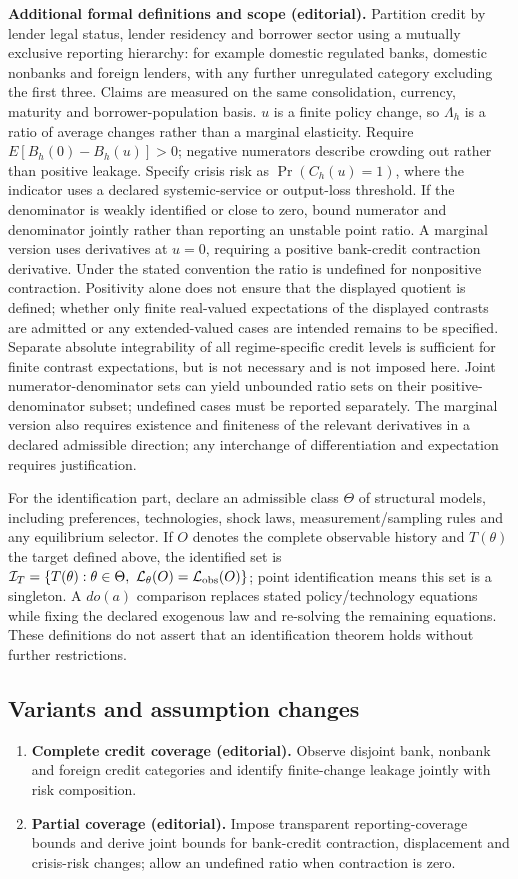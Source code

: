 \documentclass[11pt,a4paper]{article}
\begin{document}
\textbf{Additional formal definitions and scope (editorial).} Partition credit by lender legal status, lender residency and borrower sector using a mutually exclusive reporting hierarchy: for example domestic regulated banks, domestic nonbanks and foreign lenders, with any further unregulated category excluding the first three. Claims are measured on the same consolidation, currency, maturity and borrower-population basis. \(u\) is a finite policy change, so \(\Lambda_h\) is a ratio of average changes rather than a marginal elasticity. Require \(E[B_h(0)-B_h(u)]>0\); negative numerators describe crowding out rather than positive leakage. Specify crisis risk as \(\Pr(C_h(u)=1)\), where the indicator uses a declared systemic-service or output-loss threshold. If the denominator is weakly identified or close to zero, bound numerator and denominator jointly rather than reporting an unstable point ratio. A marginal version uses derivatives at \(u=0\), requiring a positive bank-credit contraction derivative. Under the stated convention the ratio is undefined for nonpositive contraction. Positivity alone does not ensure that the displayed quotient is defined; whether only finite real-valued expectations of the displayed contrasts are admitted or any extended-valued cases are intended remains to be specified. Separate absolute integrability of all regime-specific credit levels is sufficient for finite contrast expectations, but is not necessary and is not imposed here. Joint numerator-denominator sets can yield unbounded ratio sets on their positive-denominator subset; undefined cases must be reported separately. The marginal version also requires existence and finiteness of the relevant derivatives in a declared admissible direction; any interchange of differentiation and expectation requires justification.

For the identification part, declare an admissible class \(\Theta\) of structural models, including preferences, technologies, shock laws, measurement/sampling rules and any equilibrium selector. If \(O\) denotes the complete observable history and \(T(\theta)\) the target defined above, the identified set is \(\mathcal I_T=\{T(\theta):\theta\in\Theta,\ \mathcal L_\theta(O)=\mathcal L_{\rm obs}(O)\}\); point identification means this set is a singleton. A \(do(a)\) comparison replaces stated policy/technology equations while fixing the declared exogenous law and re-solving the remaining equations. These definitions do not assert that an identification theorem holds without further restrictions.
\subsection*{Variants and assumption changes}
\begin{enumerate}
\item \textbf{Complete credit coverage (editorial).} Observe disjoint bank, nonbank and foreign credit categories and identify finite-change leakage jointly with risk composition.
\item \textbf{Partial coverage (editorial).} Impose transparent reporting-coverage bounds and derive joint bounds for bank-credit contraction, displacement and crisis-risk changes; allow an undefined ratio when contraction is zero.
\end{enumerate}
\end{document}
